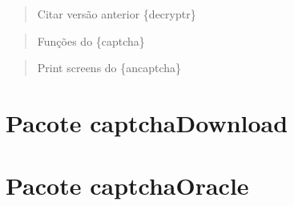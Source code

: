 \documentclass[12pt,twoside,brazilian]{book}
\begin{document}
\begin{quote}
Citar versão anterior \{decryptr\}
\end{quote}

\begin{quote}
Funções do \{captcha\}
\end{quote}

\begin{quote}
Print screens do \{ancaptcha\}
\end{quote}

\hypertarget{sec-pacote-download}{%
\section{Pacote captchaDownload}\label{sec-pacote-download}}

\hypertarget{sec-pacote-oracle}{%
\section{Pacote captchaOracle}\label{sec-pacote-oracle}}

% 
% 
% 
% 
% 
% 



%
%
%
\end{document}
